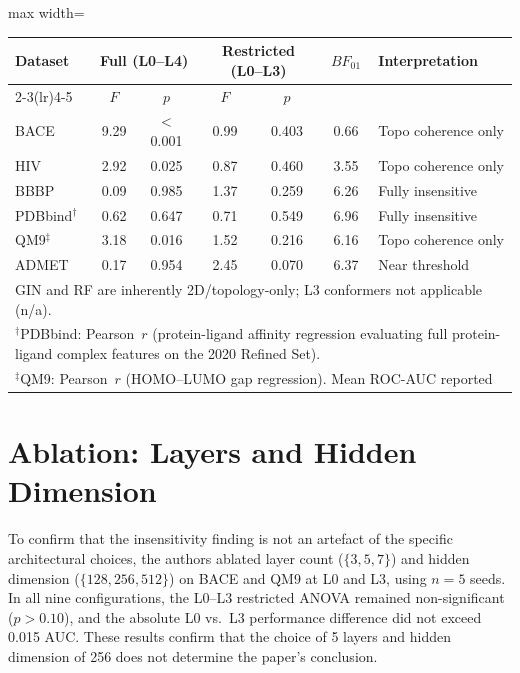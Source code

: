 \documentclass[pdflatex,sn-vancouver-num]{sn-jnl}%
\theoremstyle{thmstyleone}%
\theoremstyle{thmstyletwo}%
\theoremstyle{thmstylethree}%
\renewenvironment{table}[1][htbp]%
{\begin{tableorg}[#1]%
\begin{center}
\begin{adjustbox}{max width=\linewidth}
\begin{threeparttable}
\tablebodyfont%
\renewcommand\footnotetext[2][]{{\removelastskip\vskip3pt%
\let\tablebodyfont\tablefootnotefont%
\hskip0pt\if!##1!\else{\smash{$^{##1}$}}\fi##2\par}}%
}{\end{threeparttable}\end{adjustbox}\end{center}\end{tableorg}}
\begin{document}
\begin{table}[htbp]
  \centering
  \caption{One-way ANOVA summary, Flexi-JEGNN ($n{=}20$ seeds per level).
  Classification datasets report ROC-AUC; PDBbind$^\dagger$ and QM9$^\ddagger$ report Pearson~$r$.}
  \label{tab:anova_summary}
  \renewcommand{\arraystretch}{1.2}
  \begin{tabular}{@{}lcccccl@{}}
    \toprule
    \textbf{Dataset} &
    \multicolumn{2}{c}{\textbf{Full (L0--L4)}} &
    \multicolumn{2}{c}{\textbf{Restricted (L0--L3)}} &
    \textbf{$BF_{01}$} &
    \textbf{Interpretation} \\
    \cmidrule(lr){2-3}\cmidrule(lr){4-5}
    & $F$ & $p$ & $F$ & $p$ & & \\
    \midrule
    BACE    & 9.29  & $<$0.001 & 0.99 & 0.403 & 0.66 & Topo coherence only \\
    HIV     & 2.92  & 0.025    & 0.87 & 0.460 & 3.55 & Topo coherence only \\
    BBBP    & 0.09  & 0.985    & 1.37 & 0.259 & 6.26 & Fully insensitive \\
    PDBbind$^\dagger$ & 0.62  & 0.647    & 0.71 & 0.549 & 6.96 & Fully insensitive \\
    QM9$^\ddagger$    & 3.18  & 0.016    & 1.52 & 0.216 & 6.16 & Topo coherence only \\
    ADMET   & 0.17  & 0.954    & 2.45 & 0.070 & 6.37 & Near threshold \\
    \bottomrule
    \multicolumn{7}{l}{\small GIN and RF are inherently 2D/topology-only; L3 conformers not applicable (n/a).} \\
    \multicolumn{7}{l}{\small $^\dagger$PDBbind: Pearson~$r$ (protein-ligand affinity regression evaluating full protein-ligand complex features on the 2020 Refined Set).} \\
    \multicolumn{7}{l}{\small $^\ddagger$QM9: Pearson~$r$ (HOMO--LUMO gap regression). Mean ROC-AUC reported} \\
  \end{tabular}
\end{table}



\section{Ablation: Layers and Hidden Dimension}
\label{app:ablation}

To confirm that the insensitivity finding is not an artefact of the
specific architectural choices, the authors ablated layer count ($\{3, 5, 7\}$)
and hidden dimension ($\{128, 256, 512\}$) on BACE and QM9 at L0 and
L3, using $n{=}5$ seeds.  In all nine configurations, the L0--L3
restricted ANOVA remained non-significant ($p > 0.10$), and the
absolute L0 vs.\ L3 performance difference did not exceed 0.015
AUC.  These results confirm that the choice of 5 layers and hidden
dimension of 256 does not determine the paper's conclusion.
\end{document}

